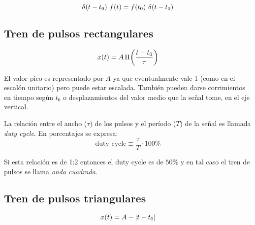 \begin{mdframed}[style=PropertyFrame]
    \begin{prop}
        \label{prop:propiedadDeMuestreo}
    \end{prop}
    \begin{equation*}
        \fx[\delta]{t-t_0} \, \fx{t} = \fx{t_0} \, \fx[\delta]{t-t_0}
    \end{equation*}
\end{mdframed}

\subsection{Tren de pulsos rectangulares}

\begin{equation*}
    \fx[x]{t} = A \, \pulse[t_0]{t}{\tau}
\end{equation*}

\begin{center}
    \def\svgwidth{0.8\linewidth}
    
\end{center}

El valor pico es representado por $A$ ya que eventualmente vale 1 (como en el escalón unitario) pero puede estar escalada.
También pueden darse corrimientos en tiempo según $t_0$ o desplazamientos del valor medio que la señal tome, en el eje vertical.

La relación entre el ancho ($\tau$) de los pulsos y el período ($T$) de la señal es llamada \emph{duty cycle}.
En porcentajes se expresa:
\begin{equation*}
    \text{duty cycle}  \equiv \frac{\tau}{T} \cdot 100\%
\end{equation*}

Si esta relación es de 1:2 entonces el duty cycle es de $50\%$ y en tal caso el tren de pulsos se llama \emph{onda cuadrada}.

\subsection{Tren de pulsos triangulares}

\begin{equation*}
    \fx[x]{t} = A - \norm{t-t_0}
\end{equation*}

\begin{center}
    \def\svgwidth{0.8\linewidth}
    
\end{center}


